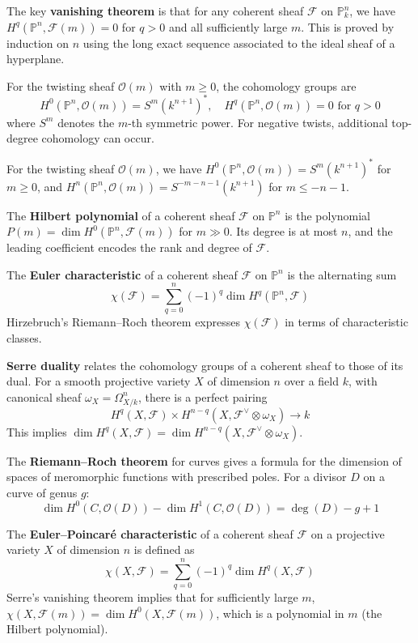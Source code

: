 The key \textbf{vanishing theorem} is that for any coherent sheaf $\mathcal{F}$ on $\mathbb{P}^n_k$, we have $H^q(\mathbb{P}^n, \mathcal{F}(m)) = 0$ for $q > 0$ and all sufficiently large $m$. This is proved by induction on $n$ using the long exact sequence associated to the ideal sheaf of a hyperplane.

For the twisting sheaf $\mathcal{O}(m)$ with $m\geq 0$, the cohomology groups are
\[H^0(\mathbb{P}^n, \mathcal{O}(m)) = S^m(k^{n+1})^*, \quad H^q(\mathbb{P}^n, \mathcal{O}(m)) = 0 \text{ for } q > 0\]
where $S^m$ denotes the $m$-th symmetric power. For negative twists, additional top-degree cohomology can occur.

For the twisting sheaf $\mathcal{O}(m)$, we have $H^0(\mathbb{P}^n, \mathcal{O}(m)) = S^m(k^{n+1})^*$ for $m \geq 0$, and $H^n(\mathbb{P}^n, \mathcal{O}(m)) = S^{-m-n-1}(k^{n+1})$ for $m \leq -n-1$.

The \textbf{Hilbert polynomial} of a coherent sheaf $\mathcal{F}$ on $\mathbb{P}^n$ is the polynomial $P(m) = \dim H^0(\mathbb{P}^n, \mathcal{F}(m))$ for $m \gg 0$. Its degree is at most $n$, and the leading coefficient encodes the rank and degree of $\mathcal{F}$.

The \textbf{Euler characteristic} of a coherent sheaf $\mathcal{F}$ on $\mathbb{P}^n$ is the alternating sum
\[\chi(\mathcal{F}) = \sum_{q=0}^n (-1)^q \dim H^q(\mathbb{P}^n, \mathcal{F})\]
Hirzebruch's Riemann--Roch theorem expresses $\chi(\mathcal{F})$ in terms of characteristic classes.

\textbf{Serre duality} relates the cohomology groups of a coherent sheaf to those of its dual. For a smooth projective variety $X$ of dimension $n$ over a field $k$, with canonical sheaf $\omega_X = \Omega^n_{X/k}$, there is a perfect pairing
\[H^q(X, \mathcal{F}) \times H^{n-q}(X, \mathcal{F}^\vee \otimes \omega_X) \to k\]
This implies $\dim H^q(X, \mathcal{F}) = \dim H^{n-q}(X, \mathcal{F}^\vee \otimes \omega_X)$.

The \textbf{Riemann--Roch theorem} for curves gives a formula for the dimension of spaces of meromorphic functions with prescribed poles. For a divisor $D$ on a curve of genus $g$:
\[\dim H^0(C, \mathcal{O}(D)) - \dim H^1(C, \mathcal{O}(D)) = \deg(D) - g + 1\]

The \textbf{Euler--Poincaré characteristic} of a coherent sheaf $\mathcal{F}$ on a projective variety $X$ of dimension $n$ is defined as
\[\chi(X, \mathcal{F}) = \sum_{q=0}^n (-1)^q \dim H^q(X, \mathcal{F})\]
Serre's vanishing theorem implies that for sufficiently large $m$, $\chi(X, \mathcal{F}(m)) = \dim H^0(X, \mathcal{F}(m))$, which is a polynomial in $m$ (the Hilbert polynomial).

